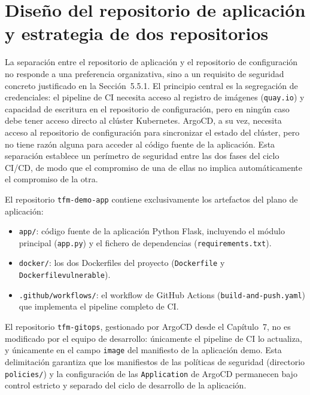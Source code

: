 \section{Diseño del repositorio de aplicación y estrategia de dos repositorios}

La separación entre el repositorio de aplicación y el repositorio de configuración no responde a una preferencia organizativa, sino a un requisito de seguridad concreto justificado en la Sección~5.5.1. El principio central es la segregación de credenciales: el pipeline de CI necesita acceso al registro de imágenes (\texttt{quay.io}) y capacidad de escritura en el repositorio de configuración, pero en ningún caso debe tener acceso directo al clúster Kubernetes. ArgoCD, a su vez, necesita acceso al repositorio de configuración para sincronizar el estado del clúster, pero no tiene razón alguna para acceder al código fuente de la aplicación. Esta separación establece un perímetro de seguridad entre las dos fases del ciclo CI/CD, de modo que el compromiso de una de ellas no implica automáticamente el compromiso de la otra.

El repositorio \texttt{tfm-demo-app} contiene exclusivamente los artefactos del plano de aplicación:

\begin{itemize}
  \item \texttt{app/}: código fuente de la aplicación Python Flask, incluyendo el módulo principal (\texttt{app.py}) y el fichero de dependencias (\texttt{requirements.txt}).
  \item \texttt{docker/}: los dos Dockerfiles del proyecto (\texttt{Dockerfile} y \texttt{Dockerfilevulnerable}).
  \item \texttt{.github/workflows/}: el workflow de GitHub Actions (\texttt{build-and-push.yaml}) que implementa el pipeline completo de CI.
\end{itemize}

El repositorio \texttt{tfm-gitops}, gestionado por ArgoCD desde el Capítulo~7, no es modificado por el equipo de desarrollo: únicamente el pipeline de CI lo actualiza, y únicamente en el campo \texttt{image} del manifiesto de la aplicación demo. Esta delimitación garantiza que los manifiestos de las políticas de seguridad (directorio \texttt{policies/}) y la configuración de las \texttt{Application} de ArgoCD permanecen bajo control estricto y separado del ciclo de desarrollo de la aplicación.

